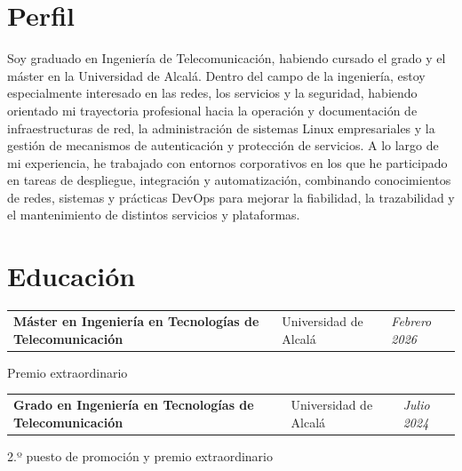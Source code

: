\vspace{-15pt}
\section{Perfil}
\begin{onecolentry}
	Soy graduado en Ingeniería de Telecomunicación, habiendo cursado el grado y el máster en la Universidad de Alcalá. Dentro del campo de la ingeniería, estoy especialmente interesado en las redes, los servicios y la seguridad, habiendo orientado mi trayectoria profesional hacia la operación y documentación de infraestructuras de red, la administración de sistemas Linux empresariales y la gestión de mecanismos de autenticación y protección de servicios. A lo largo de mi experiencia, he trabajado con entornos corporativos en los que he participado en tareas de despliegue, integración y automatización, combinando conocimientos de redes, sistemas y prácticas DevOps para mejorar la fiabilidad, la trazabilidad y el mantenimiento de distintos servicios y plataformas.
\end{onecolentry}

\vspace{-10pt}

\section{Educación}

\begin{onecolentry}
	\begin{tabularx}{\textwidth}{@{}>{\raggedright\arraybackslash}X>{\raggedright\arraybackslash}p{3.6cm}>{\raggedleft\arraybackslash}p{2.4cm}@{}}
		\textbf{Máster en Ingeniería en Tecnologías de Telecomunicación} & Universidad de Alcalá & \textit{Febrero 2026}
	\end{tabularx}
	
	\vspace{0.05 cm}
	\hspace{0.2cm}Premio extraordinario
\end{onecolentry}

\vspace{0.2 cm}

\begin{onecolentry}
	\begin{tabularx}{\textwidth}{@{}>{\raggedright\arraybackslash}X>{\raggedright\arraybackslash}p{3.6cm}>{\raggedleft\arraybackslash}p{2.4cm}@{}}
		\textbf{Grado en Ingeniería en Tecnologías de Telecomunicación} & Universidad de Alcalá & \textit{Julio 2024}
	\end{tabularx}
	
	\vspace{0.05 cm}
	\hspace{0.2cm}2.º puesto de promoción y premio extraordinario
\end{onecolentry}

